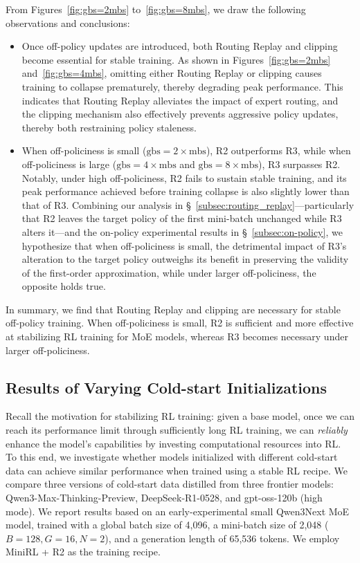 \documentclass{article}
\begin{document}
From Figures~\ref{fig:gbs=2mbs} to~\ref{fig:gbs=8mbs}, we draw the following observations and conclusions:
\begin{itemize}[leftmargin=10mm, itemsep=2mm]

\item Once off-policy updates are introduced, both Routing Replay and clipping become essential for stable training.
As shown in Figures~\ref{fig:gbs=2mbs} and~\ref{fig:gbs=4mbs}, omitting either Routing Replay or clipping causes training to collapse prematurely, thereby degrading peak performance.
This indicates that Routing Replay alleviates the impact of expert routing, and the clipping mechanism also effectively prevents aggressive policy updates, thereby both restraining policy staleness.

\item When off-policiness is small (\( \text{gbs}=2\times\text{mbs} \)), R2 outperforms R3, while when off-policiness is large (\( \text{gbs}=4\times\text{mbs} \) and \( \text{gbs}=8\times\text{mbs} \)), R3 surpasses R2.
Notably, under high off-policiness, R2 fails to sustain stable training, and its peak performance achieved before training collapse is also slightly lower than that of R3.
Combining our analysis in \S~\ref{subsec:routing_replay}—particularly that R2 leaves the target policy of the first mini-batch unchanged while R3 alters it—and the on-policy experimental results in \S~\ref{subsec:on-policy}, we hypothesize that when off-policiness is small, the detrimental impact of R3's alteration to the target policy outweighs its benefit in preserving the validity of the first-order approximation, while under larger off-policiness, the opposite holds true.

\end{itemize}

In summary, we find that Routing Replay and clipping are necessary for stable off-policy training.
When off-policiness is small, R2 is sufficient and more effective at stabilizing RL training for MoE models, whereas R3 becomes necessary under larger off-policiness.

\subsection{Results of Varying Cold-start Initializations}

Recall the motivation for stabilizing RL training: given a base model, once we can reach its performance limit through sufficiently long RL training, we can \textit{reliably} enhance the model's capabilities by investing computational resources into RL.
To this end, we investigate whether models initialized with different cold-start data can achieve similar performance when trained using a stable RL recipe.
We compare three versions of cold-start data distilled from three frontier models: Qwen3-Max-Thinking-Preview, DeepSeek-R1-0528, and gpt-oss-120b (high mode).
We report results based on an early-experimental small Qwen3Next MoE model, trained with a global batch size of 4,096, a mini-batch size of 2,048 (\(B=128, G=16, N=2\)), and a generation length of 65,536 tokens.
We employ MiniRL + R2 as the training recipe.
\end{document}
